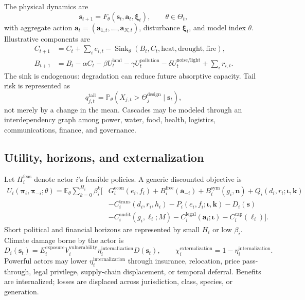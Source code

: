 \documentclass[11pt,a4paper]{article}
\numberwithin{equation}{section}
\theoremstyle{definition}
\theoremstyle{plain}
\theoremstyle{remark}
\newcommand{\E}{\mathbb{E}}
\newcommand{\Pp}{\mathbb{P}}
\newcommand{\policy}{\boldsymbol{\pi}}
\newcommand{\kpi}{\bm{k}}
\newcommand{\action}{\bm{a}}
\newcommand{\inst}{\bm{\iota}}
\newcommand{\narr}{\bm{n}}
\begin{document}
The physical dynamics are
\begin{equation}
  \bm{s}_{t+1}=F_{\theta}(\bm{s}_t,\action_t,\bm{\xi}_t),
  \qquad \theta\in\Theta_t,
  \label{eq:physicaldynamics}
\end{equation}
with aggregate action $\action_t=(\action_{1,t},\ldots,\action_{N,t})$, disturbance $\bm{\xi}_t$, and model index $\theta$. Illustrative components are
\begin{align}
C_{t+1} &= C_t + \sum_i e_{i,t} - \operatorname{Sink}_{\theta}(B_t,C_t,\text{heat},\text{drought},\text{fire}), \\
B_{t+1} &= B_t - \alpha C_t - \beta U_t^{\mathrm{land}}-\gamma U_t^{\mathrm{pollution}}
           -\delta U_t^{\mathrm{noise/light}} + \sum_i r_{i,t}.
\end{align}
The sink is endogenous: degradation can reduce future absorptive capacity. Tail risk is represented as
\begin{equation}
  q_{j,t}^{\mathrm{tail}}=\Pp_{\theta}\!\left(X_{j,t}>\Theta_j^{\mathrm{design}}\mid \bm{s}_t\right),
  \label{eq:tailrisk}
\end{equation}
not merely by a change in the mean. Cascades may be modeled through an interdependency graph among power, water, food, health, logistics, communications, finance, and governance.

\subsection{Utility, horizons, and externalization}

Let $\Pi_i^{\mathrm{feas}}$ denote actor $i$'s feasible policies. A generic discounted objective is
\begin{align}
U_i(\policy_i,\policy_{-i};\theta)
=\E_{\theta}\sum_{k=0}^{H_i}\beta_i^k\Big[&
G_i^{\mathrm{econ}}(e_i,f_i)
+B_i^{\mathrm{free}}(\action_{-i})
+B_i^{\mathrm{sym}}(g_i,\narr)
+Q_i(d_i,r_i;\inst,\kpi) \nonumber\\
&-C_i^{\mathrm{trans}}(d_i,r_i,h_i)
-P_i(e_i,f_i;\inst,\kpi)
-D_i(\bm{s}) \nonumber\\
&-C_i^{\mathrm{audit}}(g_i,\ell_i;M)
-C_i^{\mathrm{legal}}(\action_i;\inst)
-C_i^{\mathrm{cap}}(\ell_i)
\Big].
\label{eq:utility}
\end{align}
Short political and financial horizons are represented by small $H_i$ or low $\beta_i$. Climate damage borne by the actor is
\begin{equation}
D_i(\bm{s}_t)=E_i^{\mathrm{exposure}}V_i^{\mathrm{vulnerability}}
\eta_i^{\mathrm{internalization}}D(\bm{s}_t),
\qquad
\chi_i^{\mathrm{externalization}}=1-\eta_i^{\mathrm{internalization}}.
\label{eq:externalization}
\end{equation}
Powerful actors may lower $\eta_i^{\mathrm{internalization}}$ through insurance, relocation, price pass-through, legal privilege, supply-chain displacement, or temporal deferral. Benefits are internalized; losses are displaced across jurisdiction, class, species, or generation.
\end{document}

